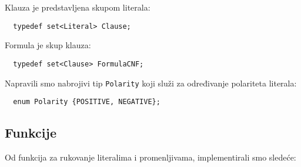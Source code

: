 \documentclass[a4paper, 12pt]{article}
\begin{document}
\noindent Klauza je predstavljena skupom literala: 
\begin{verbatim}
  typedef set<Literal> Clause;
\end{verbatim}

\noindent Formula je skup klauza:
\begin{verbatim}
  typedef set<Clause> FormulaCNF;
\end{verbatim}

\noindent Napravili smo nabrojivi tip \verb|Polarity| koji služi za određivanje polariteta literala: 
\begin{verbatim}
  enum Polarity {POSITIVE, NEGATIVE};
\end{verbatim}


\subsection{Funkcije}

\noindent Od funkcija za rukovanje literalima i promenljivama, implementirali smo sledeće:
\end{document}
